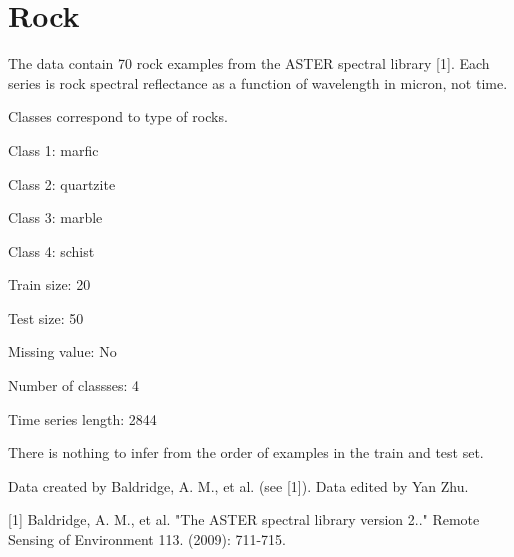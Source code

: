 \chapter{Rock}
\hypertarget{md_external_2data_2UCRArchive__2018_2Rock_2README}{}\label{md_external_2data_2UCRArchive__2018_2Rock_2README}
\label{md_external_2data_2UCRArchive__2018_2Rock_2README_autotoc_md188}%
%
 The data contain 70 rock examples from the ASTER spectral library \mbox{[}1\mbox{]}. Each series is rock spectral reflectance as a function of wavelength in micron, not time.

Classes correspond to type of rocks.


\begin{DoxyItemize}
\item Class 1\+: marfic
\item Class 2\+: quartzite
\item Class 3\+: marble
\item Class 4\+: schist
\end{DoxyItemize}

Train size\+: 20

Test size\+: 50

Missing value\+: No

Number of classses\+: 4

Time series length\+: 2844

There is nothing to infer from the order of examples in the train and test set.

Data created by Baldridge, A. M., et al. (see \mbox{[}1\mbox{]}). Data edited by Yan Zhu.

\mbox{[}1\mbox{]} Baldridge, A. M., et al. "{}\+The ASTER spectral library version 2.."{} Remote Sensing of Environment 113. (2009)\+: 711-\/715. 